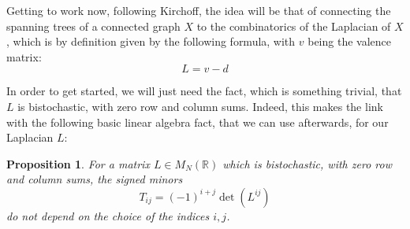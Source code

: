 \documentclass[12pt]{amsbook}
\newtheorem{proposition}[theorem]{Proposition}
\begin{document}
Getting to work now, following Kirchoff, the idea will be that of connecting the spanning trees of a connected graph $X$ to the combinatorics of the Laplacian of $X$, which is by definition given by the following formula, with $v$ being the valence matrix:
$$L=v-d$$

In order to get started, we will just need the fact, which is something trivial, that $L$ is bistochastic, with zero row and column sums. Indeed, this makes the link with the following basic linear algebra fact, that we can use afterwards, for our Laplacian $L$:


\begin{proposition}
For a matrix $L\in M_N(\mathbb R)$ which is bistochastic, with zero row and column sums, the signed minors
$$T_{ij}=(-1)^{i+j}\det(L^{ij})$$
do not depend on the choice of the indices $i,j$.
\end{proposition}
\end{document}
